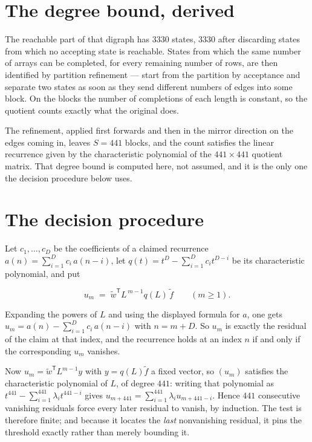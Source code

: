 \documentclass[11pt]{article}
\theoremstyle{definition}
\begin{document}
\section{The degree bound, derived}

The reachable part of that digraph has $3330$ states, $3330$ after discarding states from which no accepting state is reachable. States from which the same number of arrays can be completed, for every remaining number of rows, are then identified by partition refinement --- start from the partition by acceptance and separate two states as soon as they send different numbers of edges into some block. On the blocks the number of completions of each length is constant, so the quotient counts exactly what the original does.

The refinement, applied first forwards and then in the mirror direction on the edges coming in, leaves $S = 441$ blocks, and the count satisfies the linear recurrence given by the characteristic polynomial of the $441 \times 441$ quotient matrix. That degree bound is computed here, not assumed, and it is the only one the decision procedure below uses.

\section{The decision procedure}

Let $c_1,\dots,c_D$ be the coefficients of a claimed recurrence $a(n) = \sum_{i=1}^{D} c_i\,a(n-i)$, let $q(t) = t^{D} - \sum_{i=1}^{D} c_i t^{D-i}$ be its characteristic polynomial, and put

\[u_m \;=\; \tilde w^{\mathsf T} L^{\,m-1} q(L)\,\tilde f \qquad (m \ge 1).\]

Expanding the powers of $L$ and using the displayed formula for $a$, one gets $u_m = a(n) - \sum_{i=1}^{D} c_i\,a(n-i)$ with $n = m + D$. So $u_m$ is exactly the residual of the claim at that index, and the recurrence holds at an index $n$ if and only if the corresponding $u_m$ vanishes.

Now $u_m = \tilde w^{\mathsf T} L^{m-1} y$ with $y = q(L)\tilde f$ a fixed vector, so $(u_m)$ satisfies the characteristic polynomial of $L$, of degree $441$: writing that polynomial as $t^{441} - \sum_{i=1}^{441} \lambda_i t^{441-i}$ gives $u_{m+441} = \sum_{i=1}^{441} \lambda_i u_{m+441-i}$. Hence $441$ consecutive vanishing residuals force every later residual to vanish, by induction. The test is therefore finite; and because it locates the {\itshape last} nonvanishing residual, it pins the threshold exactly rather than merely bounding it.
\end{document}
